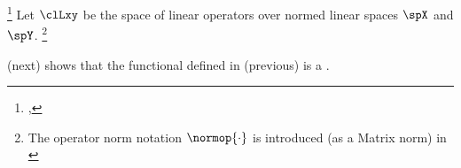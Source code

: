 \begin{definition}
\footnote{
  ,
  }
\label{def:op_norm}
\label{def:normop}
\label{def:opnorm}
   
Let $\clLxy$ be the space of linear operators over normed linear spaces $\spX$ and $\spY$.
\footnote{
  The operator norm notation $\normop{\cdot}$ is introduced (as a Matrix norm) in \\
  }
\end{definition}

 (next) shows that the functional defined in
 (previous) is a  .

